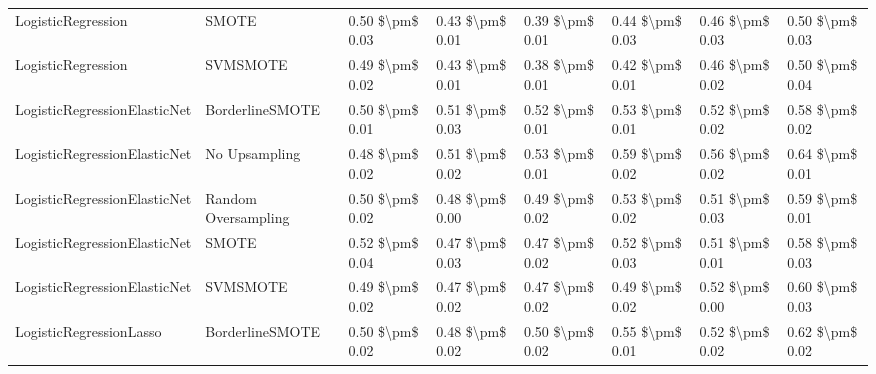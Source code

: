 \begin{tabular}{llllllll}
             LogisticRegression &                         SMOTE & 0.50 \$\textbackslash pm\$ 0.03 &           0.43 \$\textbackslash pm\$ 0.01 &       0.39 \$\textbackslash pm\$ 0.01 &        0.44 \$\textbackslash pm\$ 0.03 &                         0.46 \$\textbackslash pm\$ 0.03 & 0.50 \$\textbackslash pm\$ 0.03 \\
             LogisticRegression &                      SVMSMOTE & 0.49 \$\textbackslash pm\$ 0.02 &           0.43 \$\textbackslash pm\$ 0.01 &       0.38 \$\textbackslash pm\$ 0.01 &        0.42 \$\textbackslash pm\$ 0.01 &                         0.46 \$\textbackslash pm\$ 0.02 & 0.50 \$\textbackslash pm\$ 0.04 \\
   LogisticRegressionElasticNet &               BorderlineSMOTE & 0.50 \$\textbackslash pm\$ 0.01 &           0.51 \$\textbackslash pm\$ 0.03 &       0.52 \$\textbackslash pm\$ 0.01 &        0.53 \$\textbackslash pm\$ 0.01 &                         0.52 \$\textbackslash pm\$ 0.02 & 0.58 \$\textbackslash pm\$ 0.02 \\
   LogisticRegressionElasticNet &                 No Upsampling & 0.48 \$\textbackslash pm\$ 0.02 &           0.51 \$\textbackslash pm\$ 0.02 &       0.53 \$\textbackslash pm\$ 0.01 &        0.59 \$\textbackslash pm\$ 0.02 &                         0.56 \$\textbackslash pm\$ 0.02 & 0.64 \$\textbackslash pm\$ 0.01 \\
   LogisticRegressionElasticNet &           Random Oversampling & 0.50 \$\textbackslash pm\$ 0.02 &           0.48 \$\textbackslash pm\$ 0.00 &       0.49 \$\textbackslash pm\$ 0.02 &        0.53 \$\textbackslash pm\$ 0.02 &                         0.51 \$\textbackslash pm\$ 0.03 & 0.59 \$\textbackslash pm\$ 0.01 \\
   LogisticRegressionElasticNet &                         SMOTE & 0.52 \$\textbackslash pm\$ 0.04 &           0.47 \$\textbackslash pm\$ 0.03 &       0.47 \$\textbackslash pm\$ 0.02 &        0.52 \$\textbackslash pm\$ 0.03 &                         0.51 \$\textbackslash pm\$ 0.01 & 0.58 \$\textbackslash pm\$ 0.03 \\
   LogisticRegressionElasticNet &                      SVMSMOTE & 0.49 \$\textbackslash pm\$ 0.02 &           0.47 \$\textbackslash pm\$ 0.02 &       0.47 \$\textbackslash pm\$ 0.02 &        0.49 \$\textbackslash pm\$ 0.02 &                         0.52 \$\textbackslash pm\$ 0.00 & 0.60 \$\textbackslash pm\$ 0.03 \\
        LogisticRegressionLasso &               BorderlineSMOTE & 0.50 \$\textbackslash pm\$ 0.02 &           0.48 \$\textbackslash pm\$ 0.02 &       0.50 \$\textbackslash pm\$ 0.02 &        0.55 \$\textbackslash pm\$ 0.01 &                         0.52 \$\textbackslash pm\$ 0.02 & 0.62 \$\textbackslash pm\$ 0.02 \\

\end{tabular}

